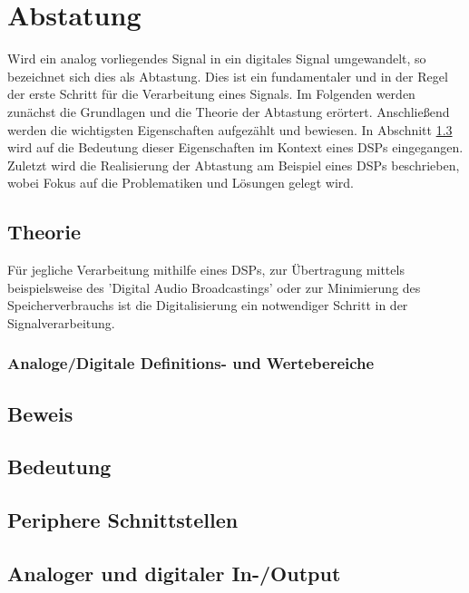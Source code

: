 \section{Abstatung}\label{3}
Wird ein analog vorliegendes Signal in ein digitales Signal umgewandelt, so bezeichnet sich dies als Abtastung. Dies ist ein fundamentaler und in der Regel der erste Schritt für die Verarbeitung eines Signals. Im Folgenden werden zunächst die Grundlagen und die Theorie der Abtastung erörtert. Anschließend werden die wichtigsten Eigenschaften aufgezählt und bewiesen. In Abschnitt \ref{3.3} wird auf die Bedeutung dieser Eigenschaften im Kontext eines DSPs eingegangen. Zuletzt wird die Realisierung der Abtastung am Beispiel eines DSPs beschrieben, wobei Fokus auf die Problematiken und Lösungen gelegt wird.
\subsection{Theorie}\label{3.1}
Für jegliche Verarbeitung mithilfe eines DSPs, zur Übertragung mittels beispielsweise des 'Digital Audio Broadcastings' oder zur Minimierung des Speicherverbrauchs ist die Digitalisierung ein notwendiger Schritt in der Signalverarbeitung. 

\subsubsection{Analoge/Digitale Definitions- und Wertebereiche}
\cite[p.2]{frey2008signal}


\subsection{Beweis}\label{3.2}
\subsection{Bedeutung}\label{3.3}
\subsection{Periphere Schnittstellen}\label{3.4}
\subsection{Analoger und digitaler In-/Output}\label{3.5}